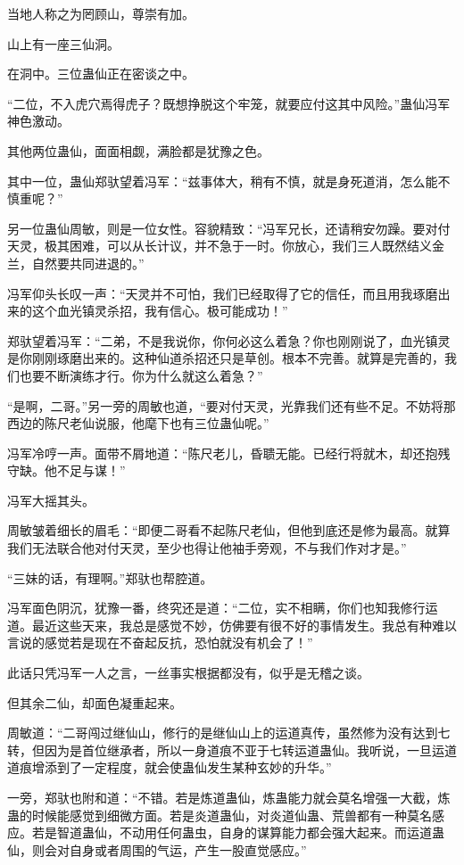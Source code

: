 \begin{this_body}
当地人称之为罔顾山，尊崇有加。

山上有一座三仙洞。

在洞中。三位蛊仙正在密谈之中。

“二位，不入虎穴焉得虎子？既想挣脱这个牢笼，就要应付这其中风险。”蛊仙冯军神色激动。

其他两位蛊仙，面面相觑，满脸都是犹豫之色。

其中一位，蛊仙郑驮望着冯军：“兹事体大，稍有不慎，就是身死道消，怎么能不慎重呢？”

另一位蛊仙周敏，则是一位女性。容貌精致：“冯军兄长，还请稍安勿躁。要对付天灵，极其困难，可以从长计议，并不急于一时。你放心，我们三人既然结义金兰，自然要共同进退的。”

冯军仰头长叹一声：“天灵并不可怕，我们已经取得了它的信任，而且用我琢磨出来的这个血光镇灵杀招，我有信心。极可能成功！”

郑驮望着冯军：“二弟，不是我说你，你何必这么着急？你也刚刚说了，血光镇灵是你刚刚琢磨出来的。这种仙道杀招还只是草创。根本不完善。就算是完善的，我们也要不断演练才行。你为什么就这么着急？”

“是啊，二哥。”另一旁的周敏也道，“要对付天灵，光靠我们还有些不足。不妨将那西边的陈尺老仙说服，他麾下也有三位蛊仙呢。”

冯军冷哼一声。面带不屑地道：“陈尺老儿，昏聩无能。已经行将就木，却还抱残守缺。他不足与谋！”

冯军大摇其头。

周敏皱着细长的眉毛：“即便二哥看不起陈尺老仙，但他到底还是修为最高。就算我们无法联合他对付天灵，至少也得让他袖手旁观，不与我们作对才是。”

“三妹的话，有理啊。”郑驮也帮腔道。

冯军面色阴沉，犹豫一番，终究还是道：“二位，实不相瞒，你们也知我修行运道。最近这些天来，我总是感觉不妙，仿佛要有很不好的事情发生。我总有种难以言说的感觉若是现在不奋起反抗，恐怕就没有机会了！”

此话只凭冯军一人之言，一丝事实根据都没有，似乎是无稽之谈。

但其余二仙，却面色凝重起来。

周敏道：“二哥闯过继仙山，修行的是继仙山上的运道真传，虽然修为没有达到七转，但因为是首位继承者，所以一身道痕不亚于七转运道蛊仙。我听说，一旦运道道痕增添到了一定程度，就会使蛊仙发生某种玄妙的升华。”

一旁，郑驮也附和道：“不错。若是炼道蛊仙，炼蛊能力就会莫名增强一大截，炼蛊的时候能感觉到细微方面。若是炎道蛊仙，对炎道仙蛊、荒兽都有一种莫名感应。若是智道蛊仙，不动用任何蛊虫，自身的谋算能力都会强大起来。而运道蛊仙，则会对自身或者周围的气运，产生一股直觉感应。”


\end{this_body}
